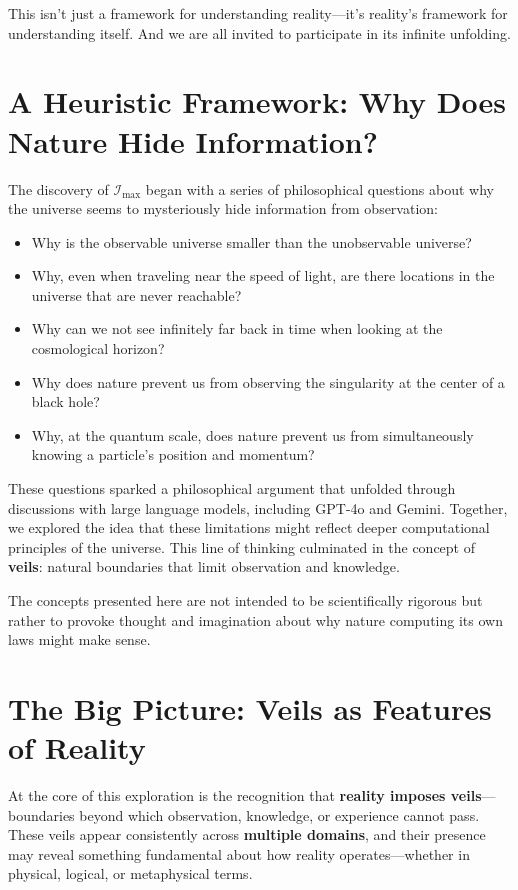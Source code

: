 \documentclass[12pt]{article}
\begin{document}
This isn’t just a framework for understanding reality—it’s reality’s framework for understanding itself. And we are all invited to participate in its infinite unfolding.


\appendix

\section{A Heuristic Framework: Why Does Nature Hide Information?}

The discovery of $\mathcal{I}_{\text{max}}$ began with a series of philosophical questions about why the universe seems to mysteriously hide information from observation:
\begin{itemize}
    \item Why is the observable universe smaller than the unobservable universe?
    \item Why, even when traveling near the speed of light, are there locations in the universe that are never reachable?
    \item Why can we not see infinitely far back in time when looking at the cosmological horizon?
    \item Why does nature prevent us from observing the singularity at the center of a black hole?
    \item Why, at the quantum scale, does nature prevent us from simultaneously knowing a particle's position and momentum?
\end{itemize}

These questions sparked a philosophical argument that unfolded through discussions with large language models, including GPT-4o and Gemini. Together, we explored the idea that these limitations might reflect deeper computational principles of the universe. This line of thinking culminated in the concept of \textbf{veils}: natural boundaries that limit observation and knowledge.

The concepts presented here are not intended to be scientifically rigorous but rather to provoke thought and imagination about why nature computing its own laws might make sense.


\section{The Big Picture: Veils as Features of Reality}

At the core of this exploration is the recognition that \textbf{reality imposes veils}—boundaries beyond which observation, knowledge, or experience cannot pass. These veils appear consistently across \textbf{multiple domains}, and their presence may reveal something fundamental about how reality operates—whether in physical, logical, or metaphysical terms.
\end{document}
